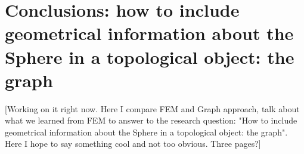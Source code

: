 

\section{Conclusions: how to include geometrical information about the Sphere in a topological object: the graph}\label{sec:Chapter4}
[Working on it right now. Here I compare FEM and Graph approach, talk about what we learned from FEM to answer to the research question: "How to include geometrical information about the Sphere in a topological object: the graph". Here I hope to say something cool and not too obvious. Three pages?]